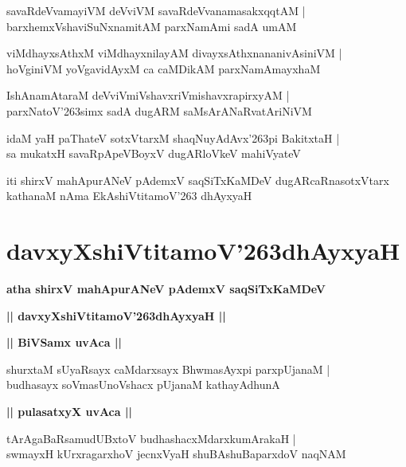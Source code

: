 \documentclass[twoside,12pt,openright]{book}
\def\S{\char'263}
\newcounter{shloka}[chapter]
\def\uvaca#1{\centerline{{\large\textbf{#1}}}}
\begin{document}
\begin{shloka}%
savaRdeVvamayiVM deVviVM savaRdeVvanamasakxqqtAM |\\
barxhemxVshaviSuNxnamitAM parxNamAmi sadA umAM 
\end{shloka}

\begin{shloka}%
viMdhayxsAthxM viMdhayxnilayAM divayxsAthxnananivAsiniVM |\\
hoVginiVM yoVgavidAyxM ca caMDikAM parxNamAmayxhaM 
\end{shloka}

\begin{shloka}%
IshAnamAtaraM deVviVmiVshavxriVmishavxrapirxyAM |\\
parxNatoV\S simx sadA dugARM saMsArANaRvatAriNiVM 
\end{shloka}

\begin{shloka}%
idaM yaH paThateV sotxVtarxM shaqNuyAdAvx\S pi BakitxtaH |\\
sa mukatxH savaRpApeVBoyxV dugARloVkeV mahiVyateV 
\end{shloka}

\begin{center}
iti shirxV mahApurANeV pAdemxV saqSiTxKaMDeV dugARcaRnasotxVtarx kathanaM nAma EkAshiVtitamoV\S 
dhAyxyaH
\end{center}

\chapter{davxyXshiVtitamoV\S dhAyxyaH}

\begin{center}
{\LARGE\bfseries atha shirxV mahApurANeV pAdemxV saqSiTxKaMDeV}
\end{center}

\begin{center}
{\LARGE\bfseries || davxyXshiVtitamoV\S dhAyxyaH || }
\end{center}

\uvaca{|| BiVSamx uvAca ||}

\begin{shloka}%
shurxtaM sUyaRsayx caMdarxsayx BhwmasAyxpi parxpUjanaM |\\
budhasayx soVmasUnoVshacx pUjanaM kathayAdhunA 
\end{shloka}

\uvaca{|| pulasatxyX uvAca ||}

\begin{shloka}%
tArAgaBaRsamudUBxtoV budhashacxMdarxkumArakaH |\\
swmayxH kUrxragarxhoV jecnxVyaH shuBAshuBaparxdoV naqNAM 
\end{shloka}
\end{document}
